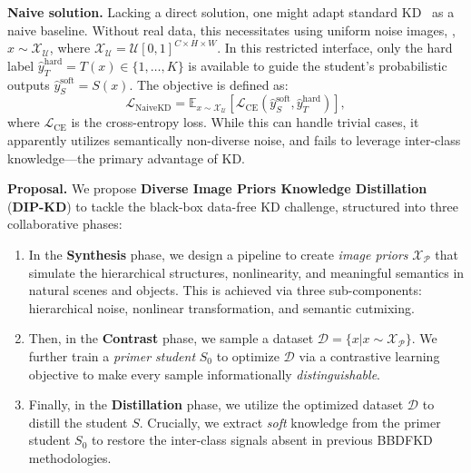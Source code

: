 \begin{foldable} %
  \textbf{Naive solution.}
  Lacking a direct solution, one might adapt standard KD~\cite{hinton2015distilling} as a naive baseline.
  Without real data, this necessitates using uniform noise images, \eg, $x \sim \mathcal{X}_\mathcal{U}$, where $\mathcal{X}_\mathcal{U} = \mathcal{U}[0,1]^{C\times H\times W}$.
  In this restricted interface, only the hard label $\hat{y}_{T}^\text{hard} = T(x) \in \{1, \ldots, K\}$ is available to guide the student's probabilistic outputs $\hat{y}_{S}^\text{soft} = S(x)$.
  The objective is defined as:
  \begin{equation} \label{eq:loss-naive-kd}
    \mathcal{L}_\text{NaiveKD} = \mathbb{E}_{x \sim \mathcal{X}_\mathcal{U}} \left[\mathcal{L}_\text{CE} \left(\hat{y}_{S}^\text{soft}, \hat{y}_{T}^\text{hard} \right)\right],
  \end{equation}
  where $\mathcal{L}_\text{CE}$ is the cross-entropy loss.
  While this can handle trivial cases, it apparently utilizes semantically non-diverse noise, and fails to leverage inter-class knowledge---the primary advantage of KD.
\end{foldable}

\begin{foldable} %
  \textbf{Proposal.}
  We propose \textbf{Diverse Image Priors Knowledge Distillation} (\textbf{DIP-KD}) to tackle the black-box data-free KD challenge, structured into three collaborative phases:
  \begin{enumerate}
    \item {
        In the \textbf{Synthesis} phase, we design a pipeline to create \textit{image priors} $\mathcal{X}_\mathcal{P}$ that simulate the hierarchical structures, nonlinearity, and meaningful semantics in natural scenes and objects.
        This is achieved via three sub-components: hierarchical noise, nonlinear transformation, and semantic cutmixing.
      }
    \item {
        Then, in the \textbf{Contrast} phase, we sample a dataset $\mathcal{D} = \{x | x \sim \mathcal{X}_\mathcal{P}\}$.
        We further train a \textit{primer student} $S_0$ to optimize $\mathcal{D}$ via a contrastive learning objective to make every sample informationally \textit{distinguishable}.
      }
    \item {
        Finally, in the \textbf{Distillation} phase, we utilize the optimized dataset $\mathcal{D}$ to distill the student $S$.
        Crucially, we extract \textit{soft} knowledge from the primer student $S_0$ to restore the inter-class signals absent in previous BBDFKD methodologies.
      }
  \end{enumerate}
\end{foldable}

